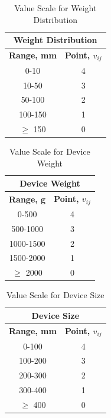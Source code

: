 \begin{table}[H]
    \centering
    \begin{tabular}{|c|c|}
        \hline
        \multicolumn{2}{|c|}{\textbf{Weight Distribution}} \\ \hline
        \textbf{Range, mm} & \textbf{Point, $v_{ij}$}      \\ \hline
        0-10               & 4                             \\ \hline
        10-50              & 3                             \\ \hline
        50-100             & 2                             \\ \hline
        100-150            & 1                             \\ \hline
        $\geq$ 150         & 0                             \\ \hline
    \end{tabular}
    \caption{Value Scale for Weight Distribution}
    \label{tab:value_scale_weight_distribution}
\end{table}

\begin{table}[H]
    \centering
    \begin{tabular}{|c|c|}
        \hline
        \multicolumn{2}{|c|}{\textbf{Device Weight}} \\ \hline
        \textbf{Range, g} & \textbf{Point, $v_{ij}$} \\ \hline
        0-500             & 4                        \\ \hline
        500-1000          & 3                        \\ \hline
        1000-1500         & 2                        \\ \hline
        1500-2000         & 1                        \\ \hline
        $\geq$ 2000       & 0                        \\ \hline
    \end{tabular}
    \caption{Value Scale for Device Weight}
    \label{tab:value_scale_device_weight}
\end{table}

\begin{table}[H]
    \centering
    \begin{tabular}{|c|c|}
        \hline
        \multicolumn{2}{|c|}{\textbf{Device Size}}    \\ \hline
        \textbf{Range, mm} & \textbf{Point, $v_{ij}$} \\ \hline
        0-100              & 4                        \\ \hline
        100-200            & 3                        \\ \hline
        200-300            & 2                        \\ \hline
        300-400            & 1                        \\ \hline
        $\geq$ 400         & 0                        \\ \hline
    \end{tabular}
    \caption{Value Scale for Device Size}
    \label{tab:value_scale_device_size}
\end{table}

